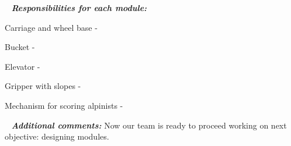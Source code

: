    \newline
  \textit{\textbf{Responsibilities for each module:}}
  \begin{enumerate*}
  	\item Carriage and wheel base - 
  	
  	\item Bucket -
  	
  	\item Elevator -
  	
  	\item Gripper with slopes -
  	
  	\item Mechanism for scoring alpinists - 
  \end{enumerate*}
  
   \newline
  \textit{\textbf{Additional comments:}} Now our team is ready to proceed working on next objective: designing modules.

\fillpage
